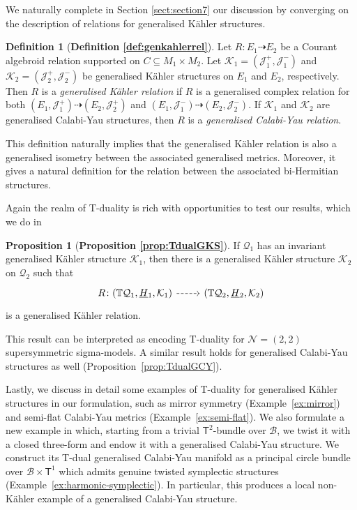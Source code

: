 \documentclass[a4paper, reqno, 11pt]{amsart}
\numberwithin{equation}{section}
\theoremstyle{definition}
\newtheorem{definition}[equation]{Definition}
\newtheorem{proposition}[equation]{Proposition}
\newcommand{\red}[1]{\underline{#1}}
\newcommand{\IT}{\mathbb{T}}
\newcommand{\cN}{{\mathcal N}}
\newcommand{\cB}{{\mathcal B}}
\newcommand{\cQ}{{\mathcal Q}}
\newcommand{\cK}{{\mathcal K}}
\newcommand{\cJ}{{\mathcal J}}
\newcommand{\sfT}{{\mathsf{T}}}
\newcommand{\rel}{\dashrightarrow}
\theoremstyle{remark}
\begin{document}
We naturally complete in {Section \ref{sect:section7}} our discussion by converging on the description of relations for generalised K{\"a}hler structures.

\begin{definition}[\textbf{Definition \ref{def:genkahlerrel}}]
     Let $R\colon E_1 \rel E_2$ be a Courant algebroid relation supported on $C \subseteq M_1 \times M_2$. Let $\cK_1 = (\cJ_1^+, \cJ_1^-)$ and $ \cK_2 = (\cJ_2^+,\cJ_2^-)$ be generalised  K\"ahler structures on $E_1$ and $E_2$, respectively.
    Then $R$ is a \emph{generalised K\"ahler relation} if $R$ is a generalised complex relation for both $(E_1, \cJ^+_1) \rel (E_2, \cJ^+_2)$ and $(E_1, \cJ_1^-) \rel (E_2, \cJ_2^-)$.
    If $\cK_1$ and $\cK_2$ are generalised Calabi-Yau structures, then $R$ is a \emph{generalised Calabi-Yau relation}.
\end{definition}

This definition naturally implies that the generalised K{\"a}hler relation is also a generalised isometry between the associated generalised metrics. Moreover, it gives a natural definition for the relation between the associated bi-Hermitian structures. 

Again the realm of T-duality is rich with opportunities to test our results, which we do in

\begin{proposition}[\textbf{Proposition \ref{prop:TdualGKS}}]
    If $\cQ_1$ has an invariant generalised K\"ahler structure $\cK_1$, then there is a generalised K\"ahler structure $\cK_2$ on $\cQ_2$ such that 
    \begin{equation}
    \begin{tikzcd}
    R \colon (\IT \cQ_1, \red H{}_1, \cK_1) \ar[r,dashed] & (\IT \cQ_2, \red H{}_2, \cK_2)
    \end{tikzcd}
    \end{equation}
    is a generalised K\"ahler relation.
\end{proposition}

This result can be interpreted as encoding T-duality for $\cN=(2,2)$ supersymmetric sigma-models. A similar result holds for generalised Calabi-Yau structures as well (Proposition~\ref{prop:TdualGCY}). 

Lastly, we discuss in detail some examples of T-duality for generalised K{\"a}hler structures in our formulation, such as mirror symmetry (Example~\ref{ex:mirror}) and semi-flat Calabi-Yau metrics (Example~\ref{ex:semi-flat}). We also formulate a  new example in which, starting from a trivial $\sfT^2$-bundle over $\cB$, we twist it with a closed three-form and endow it with a generalised Calabi-Yau structure. We  construct its T-dual generalised Calabi-Yau manifold as a principal circle bundle over $\cB \times \sfT^1$ which admits genuine twisted symplectic structures (Example~\ref{ex:harmonic-symplectic}). In particular, this produces a local non-K\"ahler example of a generalised Calabi-Yau structure.
\end{document}
